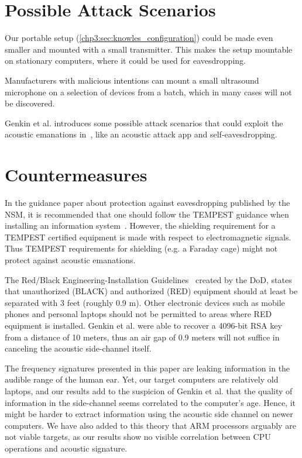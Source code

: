 \section{Possible Attack Scenarios}\label{chp6:sec:attack_scenarios}

Our portable setup (\autoref{chp3:sec:knowles_configuration}) could be made even smaller and mounted with a small transmitter. 
This makes the setup mountable on stationary computers, where it could be used for eavesdropping. 

Manufacturers with malicious intentions can mount a small ultrasound microphone on a selection of devices from a batch, which in many cases will not be discovered.

Genkin et al. introduces some possible attack scenarios that could exploit the acoustic emanations in~\cite[Section 1.2 and Appendix B]{DBLP:journals/iacr/GenkinST13}, like an acoustic attack app and self-eavesdropping.

\section{Countermeasures}\label{chp6:sec:countermeasures}

In the guidance paper about protection against eavesdropping published by the \gls{NSM}, it is recommended that one should follow the TEMPEST guidance when installing an information system~\cite[Section 9.8, page 7]{url:NSM/avlytting}.
However, the shielding requirement for a TEMPEST certified equipment is made with respect to electromagnetic signals.
Thus TEMPEST requirements for shielding (e.g. a Faraday cage) might not protect against acoustic emanations. 

The Red/Black Engineering-Installation Guidelines~\cite[Section 30.1, page 91]{url:Red/Black/Engineering} created by the \gls{DoD}, states that unauthorized (BL\gls{AC}K) and authorized (RED) equipment should at least be separated with 3 feet (roughly 0.9 m).
Other electronic devices such as mobile phones and personal laptops should not be permitted to areas where RED equipment is installed. 
Genkin et al. were able to recover a 4096-bit RSA key from a distance of 10 meters, thus an air gap of 0.9 meters will not suffice in canceling the acoustic side-channel itself.

The frequency signatures presented in this paper are leaking information in the audible range of the human ear.
Yet, our target computers are relatively old laptops, and our results add to the suspicion of Genkin et al. that the quality of information in the side-channel seems correlated to the computer's age.
Hence, it might be harder to extract information using the acoustic side channel on newer computers.
We have also added to this theory that ARM processors arguably are not viable targets, as our results show no visible correlation between CPU operations and acoustic signature.
